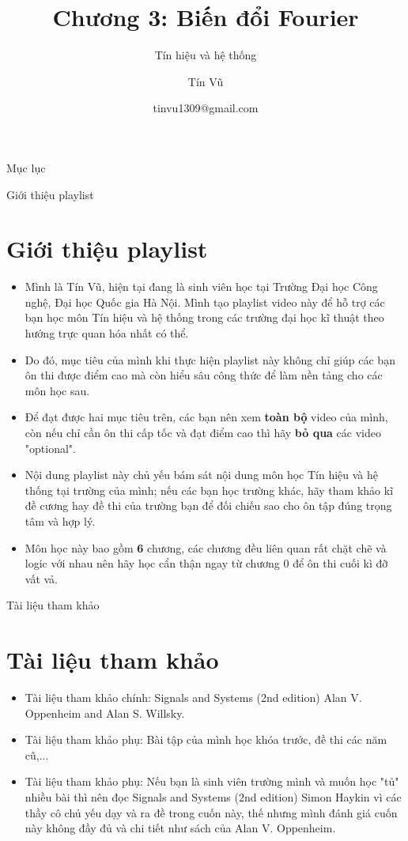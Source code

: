 \documentclass[8pt]{beamer}
\title[Chương 3: Biến đổi Fourier] %
{Chương 3: Biến đổi Fourier}
\subtitle{Tín hiệu và hệ thống}
\author[Tín hiệu và hệ thống] %
{Tín Vũ}
\date[VLC 2021] %
{tinvu1309@gmail.com}
\begin{document}
\frame{\titlepage}
\begin{frame}{Mục lục}
\tableofcontents
\end{frame}
\begin{frame}{Giới thiệu playlist}
\section{Giới thiệu playlist}
	\begin{itemize}
		\item Mình là Tín Vũ, hiện tại đang là sinh viên học tại Trường Đại học Công nghệ, Đại học Quốc gia Hà Nội. Mình tạo playlist video này để hỗ trợ các bạn học môn Tín hiệu và hệ thống trong các trường đại học kĩ thuật theo hướng \alert{trực quan hóa} nhất có thể.
		\item Do đó, mục tiêu của mình khi thực hiện playlist này không chỉ giúp các bạn ôn thi được điểm cao mà còn \alert{hiểu sâu công thức để làm nền tảng cho các môn học sau}.
		\item Để đạt được hai mục tiêu trên, các bạn nên xem \textbf{toàn bộ} video của mình, còn nếu chỉ cần ôn thi cấp tốc và đạt điểm cao thì hãy \textbf{bỏ qua} các video "optional".
		\item Nội dung playlist này chủ yếu bám sát nội dung môn học Tín hiệu và hệ thống tại trường của mình; nếu các bạn học trường khác, hãy tham khảo kĩ đề cương hay đề thi của trường bạn để đối chiếu sao cho ôn tập đúng trọng tâm và hợp lý. 
		\item Môn học này bao gồm \textbf{6} chương, các chương đều liên quan rất chặt chẽ và logic với nhau nên hãy học cẩn thận ngay từ \alert{chương 0} để ôn thi cuối kì đỡ vất vả.
	\end{itemize}
\end{frame}
\begin{frame}{Tài liệu tham khảo}
\section{Tài liệu tham khảo}
\begin{itemize}
		\item Tài liệu tham khảo chính: Signals and Systems (2nd edition) Alan V. Oppenheim and Alan S. Willsky.
		\item Tài liệu tham khảo phụ: Bài tập của mình học khóa trước, đề thi các năm cũ,...
		\item Tài liệu tham khảo phụ: Nếu bạn là sinh viên trường mình và muốn học "tủ" nhiều bài thì nên đọc Signals and Systems (2nd edition) Simon Haykin vì các thầy cô chủ yếu dạy và ra đề trong cuốn này, thế nhưng mình đánh giá cuốn này không đầy đủ và chi tiết như sách của Alan V. Oppenheim. 
	\end{itemize}
\end{frame}
\end{document}
